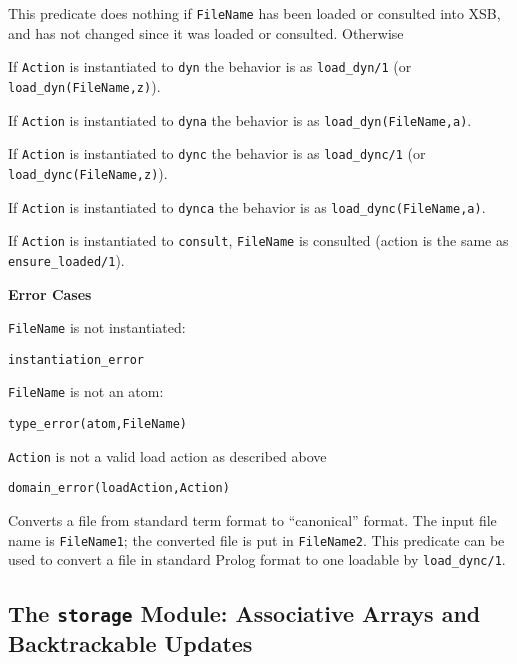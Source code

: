 \begin{description}
%
This predicate does nothing if {\tt FileName} has been loaded or
consulted into XSB, and has not changed since it was loaded or
consulted.  Otherwise
%
\bi
\item If {\tt Action} is instantiated to {\tt dyn} the behavior is as
{\tt load\_dyn/1} (or {\tt load\_dyn(FileName,z)}).

\item If {\tt Action} is instantiated to {\tt dyna} the behavior is as
{\tt load\_dyn(FileName,a)}.

\item If {\tt Action} is instantiated to {\tt dync} the behavior is as
{\tt load\_dync/1} (or {\tt load\_dync(FileName,z)}).

\item If {\tt Action} is instantiated to {\tt dynca} the behavior is as
{\tt load\_dync(FileName,a)}.

\item If {\tt Action} is instantiated to {\tt consult}, {\tt FileName}
is consulted (action is the same as {\tt ensure\_loaded/1}).

\ei

{\bf Error Cases}
\bi
\item 	{\tt FileName} is not instantiated:
\bi
\item 	{\tt instantiation\_error}
\ei
\item 	{\tt FileName} is not an atom:
\bi
\item 	{\tt type\_error(atom,FileName)}
\ei
%
\item 	{\tt Action} is not a valid load action as described above
\bi
\item 	{\tt domain\_error(loadAction,Action)}
\ei
%
\ei

%
    Converts a file from standard term format to ``canonical'' format.
    The input file name is {\tt FileName1}; the converted file is put in
    {\tt FileName2}.  This predicate can be used to convert a file in
    standard Prolog format to one loadable by {\tt load\_dync/1}.
\end{description}


\subsection{The {\tt storage} Module: Associative Arrays and Backtrackable Updates}
\label{storage module}

